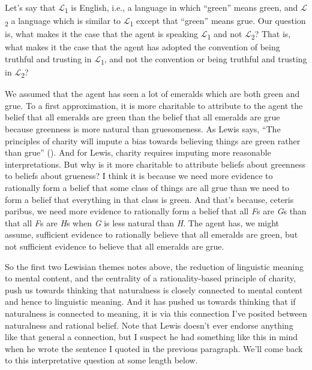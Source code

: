 \documentclass[
  10pt,
  letterpaper,
  DIV=11,
  numbers=noendperiod,
  twoside]{scrartcl}
\begin{document}
Let's say that \(\mathcal{L}\)\textsubscript{1} is English, i.e., a
language in which ``green'' means green, and
\(\mathcal{L}\)\textsubscript{2} a language which is similar to
\(\mathcal{L}\)\textsubscript{1} except that ``green'' means grue. Our
question is, what makes it the case that the agent is speaking
\(\mathcal{L}\)\textsubscript{1} and not
\(\mathcal{L}\)\textsubscript{2}? That is, what makes it the case that
the agent has adopted the convention of being truthful and trusting in
\(\mathcal{L}\)\textsubscript{1}, and not the convention or being
truthful and trusting in \(\mathcal{L}\)\textsubscript{2}?

We assumed that the agent has seen a lot of emeralds which are both
green and grue. To a first approximation, it is more charitable to
attribute to the agent the belief that all emeralds are green than the
belief that all emeralds are grue because greenness is more natural than
gruesomeness. As Lewis says, ``The principles of charity will impute a
bias towards believing things are green rather than grue''
(). And for Lewis, charity requires
imputing more reasonable interpretations. But why is it more charitable
to attribute beliefs about greenness to beliefs about grueness? I think
it is because we need more evidence to rationally form a belief that
some class of things are all grue than we need to form a belief that
everything in that class is green. And that's because, ceteris paribus,
we need more evidence to rationally form a belief that all \emph{F}s are
\emph{G}s than that all \emph{F}s are \emph{H}s when \emph{G} is less
natural than \emph{H}. The agent has, we might assume, sufficient
evidence to rationally believe that all emeralds are green, but not
sufficient evidence to believe that all emeralds are grue.

So the first two Lewisian themes notes above, the reduction of
linguistic meaning to mental content, and the centrality of a
rationality-based principle of charity, push us towards thinking that
naturalness is closely connected to mental content and hence to
linguistic meaning. And it has pushed us towards thinking that if
naturalness is connected to meaning, it is via this connection I've
posited between naturalness and rational belief. Note that Lewis doesn't
ever endorse anything like that general a connection, but I suspect he
had something like this in mind when he wrote the sentence I quoted in
the previous paragraph. We'll come back to this interpretative question
at some length below.
\end{document}
